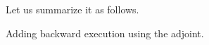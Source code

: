 \documentclass{llncs}
\begin{document}
Let us summarize it as follows.

\begin{center}
\end{center}

Adding backward execution using the adjoint.

\begin{center}
\end{center}


 

\end{document}

